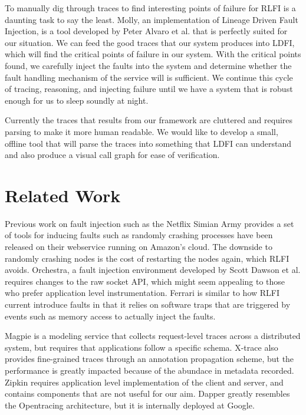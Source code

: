 \documentclass[letterpaper,twocolumn,10pt]{article}
\begin{document}
To manually dig through traces to find interesting points of failure for RLFI is a daunting task to say the least. Molly, an implementation of Lineage Driven Fault Injection, is a tool developed by Peter Alvaro et al.\cite{alvaro:ldfi} that is perfectly suited for our situation. We can feed the good traces that our system produces into LDFI, which will find the critical points of failure in our system. With the critical points found, we carefully inject the faults into the system and determine whether the fault handling mechanism of the service will is sufficient. We continue this cycle of tracing, reasoning, and injecting failure until we have a system that is robust enough for us to sleep soundly at night.

Currently the traces that results from our framework are cluttered and requires parsing to make it more human readable. We would like to develop a small, offline tool that will parse the traces into something that LDFI can understand and also produce a visual call graph for ease of verification. 


\section{Related Work}
Previous work on fault injection such as the Netflix Simian Army\cite{netflix:chaosmonkey} provides a set of tools for inducing faults such as randomly crashing processes have been released on their webservice running on Amazon's cloud. The downside to randomly crashing nodes is the cost of restarting the nodes again, which RLFI avoids. Orchestra\cite{orchestra}, a fault injection environment developed by Scott Dawson et al. requires changes to the raw socket API, which might seem appealing to those who prefer application level instrumentation. Ferrari\cite{ferrari} is similar to how RLFI current introduce faults in that it relies on software traps that are triggered by events such as memory access to actually inject the faults.

Magpie\cite{magpie} is a modeling service that collects request-level traces across a distributed system, but requires that applications follow a specific schema. X-trace\cite{xtrace} also provides fine-grained traces through an annotation propagation scheme, but the performance is greatly impacted because of the abundace in metadata recorded. Zipkin\cite{zipkin} requires application level implementation of the client and server, and contains components that are not useful for our aim. Dapper\cite{sigelman:dapper} greatly resembles the Opentracing architecture, but it is internally deployed at Google. 
\end{document}
